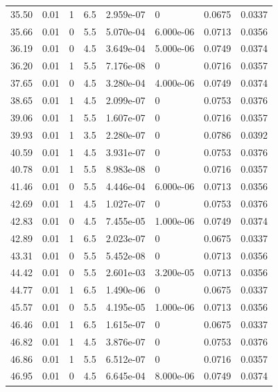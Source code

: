 \documentclass[preview]{standalone}
\begin{document}
{{{\begin{tabular}{L{1.2cm}C{1.2cm} C{0.3cm}C{0.5cm} C{1.4cm}C{1.4cm} C{1.4cm}C{1.4cm}}
  35.50  &  0.01  & 1     & 6.5 &  2.959e-07  & 0  & 0.0675 &  0.0337   \\ 
  35.66  &  0.01  & 0     & 5.5 &  5.070e-04  & 6.000e-06  & 0.0713 &  0.0356   \\ 
  36.19  &  0.01  & 0     & 4.5 &  3.649e-04  & 5.000e-06  & 0.0749 &  0.0374   \\ 
  36.20  &  0.01  & 1     & 5.5 &  7.176e-08  & 0  & 0.0716 &  0.0357   \\ 
  37.65  &  0.01  & 0     & 4.5 &  3.280e-04  & 4.000e-06  & 0.0749 &  0.0374   \\ 
  38.65  &  0.01  & 1     & 4.5 &  2.099e-07  & 0  & 0.0753 &  0.0376   \\ 
  39.06  &  0.01  & 1     & 5.5 &  1.607e-07  & 0  & 0.0716 &  0.0357   \\ 
  39.93  &  0.01  & 1     & 3.5 &  2.280e-07  & 0  & 0.0786 &  0.0392   \\ 
  40.59  &  0.01  & 1     & 4.5 &  3.931e-07  & 0  & 0.0753 &  0.0376   \\ 
  40.78  &  0.01  & 1     & 5.5 &  8.983e-08  & 0  & 0.0716 &  0.0357   \\ 
  41.46  &  0.01  & 0     & 5.5 &  4.446e-04  & 6.000e-06  & 0.0713 &  0.0356   \\ 
  42.69  &  0.01  & 1     & 4.5 &  1.027e-07  & 0  & 0.0753 &  0.0376   \\ 
  42.83  &  0.01  & 0     & 4.5 &  7.455e-05  & 1.000e-06  & 0.0749 &  0.0374   \\ 
  42.89  &  0.01  & 1     & 6.5 &  2.023e-07  & 0  & 0.0675 &  0.0337   \\ 
  43.31  &  0.01  & 0     & 5.5 &  5.452e-08  & 0  & 0.0713 &  0.0356   \\ 
  44.42  &  0.01  & 0     & 5.5 &  2.601e-03  & 3.200e-05  & 0.0713 &  0.0356   \\ 
  44.77  &  0.01  & 1     & 6.5 &  1.490e-06  & 0  & 0.0675 &  0.0337   \\ 
  45.57  &  0.01  & 0     & 5.5 &  4.195e-05  & 1.000e-06  & 0.0713 &  0.0356   \\ 
  46.46  &  0.01  & 1     & 6.5 &  1.615e-07  & 0  & 0.0675 &  0.0337   \\ 
  46.82  &  0.01  & 1     & 4.5 &  3.876e-07  & 0  & 0.0753 &  0.0376   \\ 
  46.86  &  0.01  & 1     & 5.5 &  6.512e-07  & 0  & 0.0716 &  0.0357   \\ 
  46.95  &  0.01  & 0     & 4.5 &  6.645e-04  & 8.000e-06  & 0.0749 &  0.0374   \\ 

\end{tabular}}}}
\end{document}
